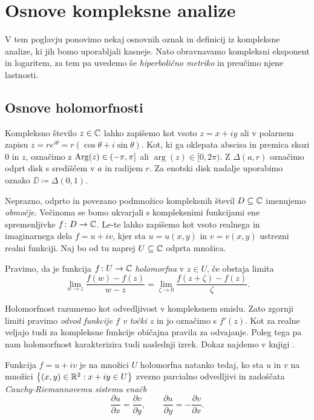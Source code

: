 \section{Osnove kompleksne analize} \label{sec:hipgeom}

V tem poglavju ponovimo nekaj osnovnih oznak in definicij iz kompleksne analize, ki jih bomo uporabljali kasneje. Nato obravnavamo kompleksni eksponent in logaritem, za tem pa uvedemo še \emph{hiperbolično metriko} in preučimo njene lastnosti.

\subsection{Osnove holomorfnosti}

Kompleksno število \(z \in \mathbb C\) lahko zapišemo kot vsoto \(z = x + i y\) ali v polarnem zapisu \(z = r e^{i \theta} = r (\cos \theta + i \sin \theta)\). Kot, ki ga oklepata abscisa in premica skozi \(0\) in \(z\), označimo z \(\operatorname{Arg} (z) \in (- \pi, \pi]\) ali \(\arg (z) \in [0, 2 \pi)\). Z \(\Delta (a, r)\) označimo odprt disk s središčem v \(a\) in radijem \(r\). Za enotski disk nadalje uporabimo oznako \(\DD \coloneq \Delta (0, 1)\).

Neprazno, odprto in povezano podmnožico kompleksnih števil \(D \subseteq \mathbb C\) imenujemo \emph{območje}. Večinoma se bomo ukvarjali s kompleksnimi funkcijami ene spremenljivke \(f \colon D \to \mathbb C\). Le-te lahko zapišemo kot vsoto realnega in imaginarnega dela \(f = u + iv\), kjer sta \(u = u (x, y)\) in \(v = v (x, y)\) ustrezni realni funkciji. Naj bo od tu naprej \(U \subseteq \mathbb C\) odprta množica.

\begin{definicija}
    Pravimo, da je funkcija \(f \colon U \to \mathbb C\) \emph{holomorfna} v \(z \in U\), če obstaja limita
    \[\lim_{w \to z} \frac{f (w) - f (z)}{w - z} = \lim_{\zeta \to 0} \frac{f (z + \zeta) - f (z)}{\zeta}.\]
\end{definicija}

Holomorfnost razumemo kot odvedljivost v kompleksnem smislu. Zato zgornji limiti pravimo \emph{odvod funkcije \(f\) v točki \(z\)} in jo označimo s \(f' (z)\). Kot za realne veljajo tudi za kompleksne funkcije običajna pravila za odvajanje. Poleg tega pa nam holomorfnost karakterizira tudi naslednji izrek. Dokaz najdemo v knjigi \cite[izrek 43]{Globevnik_2010}.

\begin{izrek} \label{thm:cr}
    Funkcija \(f = u + i v\) je na množici \(U\) holomorfna natanko tedaj, ko sta \(u\) in \(v\) na množici \(\left\{ (x, y) \in \mathbb R^2 : x + i y \in U \right\}\) zvezno parcialno odvedljivi in zadoščata \emph{Cauchy-Riemannovemu sistemu enačb}
    \begin{equation} \tag{CR} \label{eq:cr}
        \frac{\partial u}{\partial x} = \frac{\partial v}{\partial y}, \qquad \frac{\partial u}{\partial y} = - \frac{\partial v}{\partial x}.
    \end{equation}
\end{izrek}

